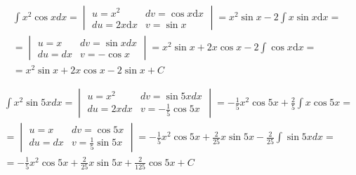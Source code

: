 
\begin{gather*}
  \int x^2\cos x dx =
  \begin{vmatrix}
    u=x^2 & dv=\cos{x} \mbox{d}x \\
    du=2x \mbox{d}x & v=\sin{x}
  \end{vmatrix}
  = x^2\sin x - 2\int x\sin x \mbox{d} x = \\
  = \begin{vmatrix}
    u=x & dv=\sin x dx\\
    du=dx & v=-\cos x
  \end{vmatrix}
  = x^2\sin x + 2x\cos x - 2\int \cos x \mbox{d}x = \\
  = x^2\sin x + 2x\cos x - 2\sin x +C
\end{gather*}


\begin{gather*}
  \int x^2\sin 5x dx =
  \begin{vmatrix}
    u=x^2 & dv=\sin 5xdx \\
    du=2xdx & v=-\frac{1}{5}\cos 5x
  \end{vmatrix}
  = -\frac{1}{5}x^2\cos 5x + \frac{2}{5}\int x\cos 5x = \\
  = \begin{vmatrix}
    u=x & dv=\cos 5x \\
    du=dx & v=\frac{1}{5}\sin 5x
  \end{vmatrix}
  = -\frac{1}{5}x^2\cos 5x + \frac{2}{25}x\sin 5x - \frac{2}{25}\int \sin 5x dx = \\
  = -\frac{1}{5}x^2\cos 5x + \frac{2}{25}x\sin 5x + \frac{2}{125}\cos 5x+C
\end{gather*}





